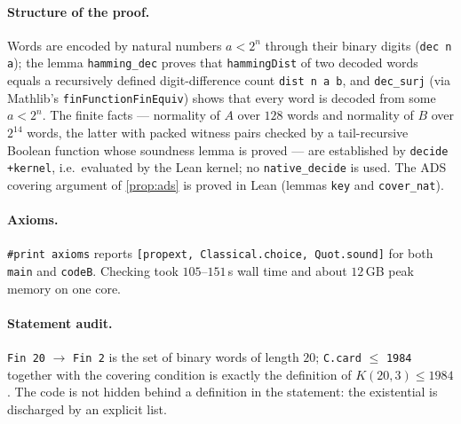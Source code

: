\documentclass[11pt]{article}
\numberwithin{equation}{section}
\theoremstyle{definition}
\theoremstyle{remark}
\begin{document}
\paragraph{Structure of the proof.} Words are encoded by natural numbers $a<2^n$ through their binary
digits (\texttt{dec n a}); the lemma \texttt{hamming\_dec} proves that \texttt{hammingDist} of two
decoded words equals a recursively defined digit-difference count \texttt{dist n a b}, and
\texttt{dec\_surj} (via Mathlib's \texttt{finFunctionFinEquiv}) shows that every word is decoded from
some $a<2^n$. The finite facts --- normality of $A$ over $128$ words and normality of $B$ over $2^{14}$
words, the latter with packed witness pairs checked by a tail-recursive Boolean function whose soundness
lemma is proved --- are established by \texttt{decide +kernel}, i.e.\ evaluated by the Lean kernel; no
\texttt{native\_decide} is used. The ADS covering argument of \cref{prop:ads} is proved in Lean
(lemmas \texttt{key} and \texttt{cover\_nat}).

\paragraph{Axioms.} \texttt{\#print axioms} reports \texttt{[propext, Classical.choice, Quot.sound]} for
both \texttt{main} and \texttt{codeB}. Checking took $105$--$151$\,s wall time and about $12$\,GB peak memory on one
core.

\paragraph{Statement audit.} \texttt{Fin 20} $\to$ \texttt{Fin 2} is the set of binary words of length $20$;
\texttt{C.card} $\le$ \texttt{1984} together with the covering condition is exactly the definition of
$K(20,3)\le1984$. The code is not hidden behind a definition in the statement: the existential is
discharged by an explicit list.
\end{document}
